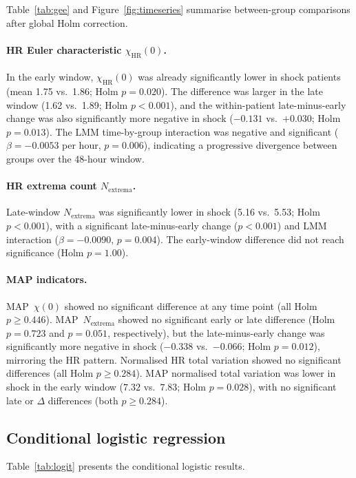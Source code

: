 \documentclass[12pt,a4paper]{article}
\begin{document}
Table~\ref{tab:gee} and Figure~\ref{fig:timeseries} summarise between-group
comparisons after global Holm correction.

\paragraph{HR Euler characteristic $\chi_{\text{HR}}(0)$.}
In the early window, $\chi_{\text{HR}}(0)$ was already significantly lower
in shock patients (mean 1.75 vs.\ 1.86; Holm $p=0.020$).
The difference was larger in the late window (1.62 vs.\ 1.89;
Holm $p<0.001$), and the within-patient late-minus-early change was also
significantly more negative in shock ($-0.131$ vs.\ $+0.030$;
Holm $p=0.013$).
The LMM time-by-group interaction was negative and significant
($\beta=-0.0053$ per hour, $p=0.006$), indicating a progressive divergence
between groups over the 48-hour window.

\paragraph{HR extrema count $N_{\text{extrema}}$.}
Late-window $N_{\text{extrema}}$ was significantly lower in shock
(5.16 vs.\ 5.53; Holm $p<0.001$), with a significant late-minus-early
change ($p<0.001$) and LMM interaction ($\beta=-0.0090$, $p=0.004$).
The early-window difference did not reach significance (Holm $p=1.00$).

\paragraph{MAP indicators.}
MAP~$\chi(0)$ showed no significant difference at any time point (all Holm
$p\geq0.446$).
MAP~$N_{\text{extrema}}$ showed no significant early or late difference
(Holm $p=0.723$ and $p=0.051$, respectively), but the late-minus-early
change was significantly more negative in shock ($-0.338$ vs.\ $-0.066$;
Holm $p=0.012$), mirroring the HR pattern.
Normalised HR total variation showed no significant differences
(all Holm $p\geq0.284$).
MAP normalised total variation was lower in shock in the early window
($7.32$ vs.\ $7.83$; Holm $p=0.028$), with no significant late or
$\Delta$ differences (both $p\geq0.284$).

\subsection{Conditional logistic regression}
\label{sec:res-logit}

Table~\ref{tab:logit} presents the conditional logistic results.
\end{document}
